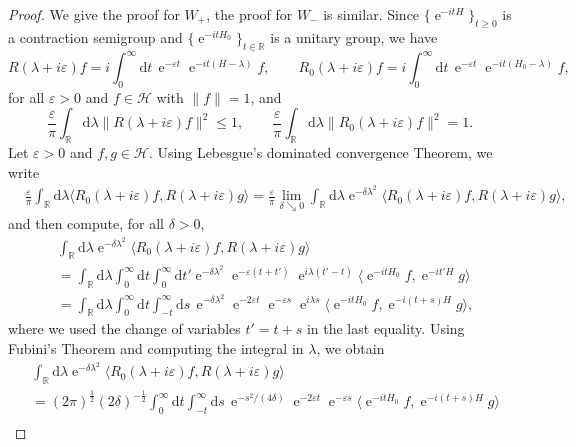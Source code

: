 \documentclass{article}
\def\d{\mathrm{d}}
\def\H{\mathcal H}
\def\R{\mathbb R}
\def\e{\mathop{\mathrm{e}}\nolimits}
\begin{document}
\begin{proof}
We give the proof for $W_+$, the proof for $W_-$ is similar. 
Since $\{ \e^{-itH} \}_{ t \ge 0 }$ is a contraction semigroup and $\{ \e^{-itH_0} \}_{ t \in\R }$ is a unitary group, we have 
\begin{equation*}
R(\lambda+i\varepsilon)f=i\int_0^\infty \d t\, \e^{-\varepsilon t}\e^{-it(H-\lambda)}f, \qquad R_0(\lambda+i\varepsilon)f=i\int_0^\infty \d t\, \e^{-\varepsilon t}\e^{-it(H_0-\lambda)}f,
\end{equation*}
for all $\varepsilon>0$ and $f\in\H$ with $\|f\|=1$, and 
\begin{equation*}
\frac{\varepsilon}{\pi} \int_{\R}\d \lambda \|R(\lambda+i\varepsilon)f\|^2\le1, \qquad \frac{\varepsilon}{\pi} \int_{\R}\d \lambda \|R_0(\lambda+i\varepsilon)f\|^2=1.
\end{equation*}
Let $\varepsilon>0$ and $f,g\in\H$. Using Lebesgue's dominated convergence Theorem, we write
\begin{align}\label{eq:int-formula}
&\frac{\varepsilon}{\pi} \int_{\R}\d \lambda \langle R_0(\lambda+i \varepsilon)f, R(\lambda + i \varepsilon) g\rangle =\frac{\varepsilon}{\pi}\lim_{\delta\searrow 0}  \int_{\R}\d \lambda \e^{-\delta\lambda^2} \langle R_0(\lambda+i \varepsilon)f, R(\lambda + i \varepsilon) g\rangle , 
\end{align}
and then compute, for all $\delta>0$,
\begin{align*}
&\int_{\R}\d \lambda \e^{-\delta\lambda^2} \langle R_0(\lambda+i \varepsilon)f, R(\lambda + i \varepsilon) g\rangle \\
&= \int_{\R}\d \lambda \int_0^\infty \d t \int_0^\infty \d t' \e^{-\delta\lambda^2} \e^{-\varepsilon (t+t')} \e^{i\lambda(t'-t)} \langle \e^{-itH_0}f, \e^{-it'H} g\rangle \\
&= \int_{\R}\d \lambda \int_0^\infty \d t \int_{-t}^\infty \d s \,  \e^{-\delta\lambda^2} \e^{-2\varepsilon t} \e^{-\varepsilon s} \e^{i\lambda s} \langle \e^{-itH_0}f, \e^{-i(t+s)H} g\rangle ,
\end{align*}
where we used the change of variables $t'=t+s$ in the last equality. Using Fubini's Theorem and computing the integral in $\lambda$, we obtain
\begin{align*}
&\int_{\R}\d \lambda \e^{-\delta\lambda^2} \langle R_0(\lambda+i \varepsilon)f, R(\lambda + i \varepsilon) g\rangle \\
&= (2\pi)^\frac12 (2\delta)^{-\frac12} \int_0^\infty \d t \int_{-t}^\infty \d s \,  \e^{-s^2/(4\delta)} \e^{-2\varepsilon t} \e^{-\varepsilon s}  \langle \e^{-itH_0}f, \e^{-i(t+s)H} g\rangle \\

\end{align*}
\end{proof}
\end{document}
